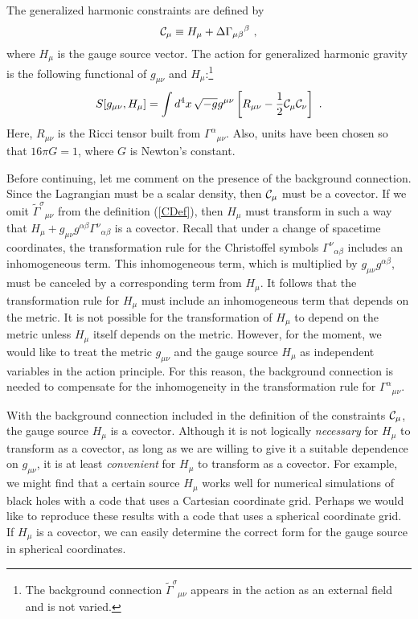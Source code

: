 \documentclass[letterpaper,nofootinbib,prd,amsmath,twocolumn]{revtex4-1}
\begin{document}
The generalized harmonic constraints are defined by
\begin{equation}\label{CDef}
  {\cal C}_\mu \equiv H_\mu + \Delta\Gamma_{\mu\beta}{}^\beta  \ ,
\end{equation} 
where $H_\mu$ is the gauge source vector. 
The  action for generalized harmonic gravity is the following functional of $g_{\mu\nu}$ and 
$H_\mu$:\footnote{The background connection $\tilde\Gamma^\sigma{}_{\mu\nu}$ appears in the action as an external 
field and is not varied.}
\begin{equation}\label{GHaction}
  S[g_{\mu\nu},H_\mu] =  
		\int d^4x \, \sqrt{-g} g^{\mu\nu} \left[ R_{\mu\nu}
		- \frac{1}{2} {\cal C}_\mu {\cal C}_\nu \right]  \ .
\end{equation}
Here, $R_{\mu\nu}$ is the Ricci tensor built from $\Gamma^\alpha{}_{\mu\nu}$. Also,  
units have been chosen so that $16\pi G = 1$, where $G$ is Newton's constant. 

Before continuing, let me comment on the presence of the background connection. 
Since the Lagrangian must be a scalar density, then ${\cal C}_\mu$ must be a covector. 
If we omit $\tilde\Gamma^\sigma{}_{\mu\nu}$ from the definition (\ref{CDef}), then $H_\mu$ 
must transform in such a way that $H_\mu + g_{\mu\nu} g^{\alpha\beta} \Gamma^\nu{}_{\alpha\beta}$ 
is a covector. Recall that under a change of spacetime coordinates, the transformation 
rule for the Christoffel symbols $\Gamma^\nu{}_{\alpha\beta}$ includes an inhomogeneous term. This 
inhomogeneous term, which is multiplied by $g_{\mu\nu} g^{\alpha\beta}$, must be canceled by a 
corresponding term from $H_\mu$. It follows that the transformation rule for 
$H_\mu$ must include an inhomogeneous term that depends on the metric. It is not possible for the 
transformation of $H_\mu$ to depend on the metric unless $H_\mu$ itself depends on the metric. However, 
for the moment, we would like to treat the metric $g_{\mu\nu}$ and the gauge source $H_\mu$ as independent 
variables in the action principle. For this reason, the background connection is needed to 
compensate for the inhomogeneity in the transformation rule for $\Gamma^\alpha{}_{\mu\nu}$. 

With the background connection included in the definition of the constraints ${\cal C}_\mu$, the 
gauge source $H_\mu$ is a covector. Although it is not logically {\em necessary} for $H_\mu$ to transform 
as a covector, as long as we are willing to give it a suitable dependence on $g_{\mu\nu}$, it is at least 
{\em convenient} for $H_\mu$ to transform as a covector.
For example, we might find that a certain source $H_\mu$ works 
well for numerical simulations of black holes with a code that uses a Cartesian coordinate grid. 
Perhaps we would like to reproduce these results with a code that uses a spherical coordinate grid. If $H_\mu$ 
is a covector, we can easily determine the correct form for the gauge source in spherical coordinates. 
\end{document}
